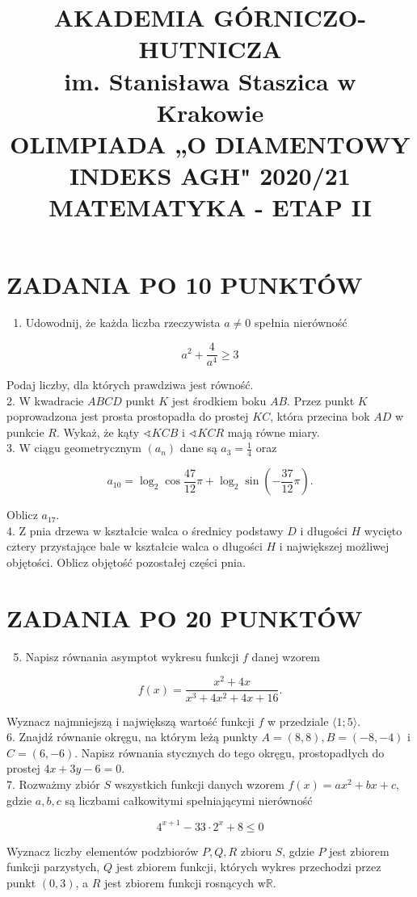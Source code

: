 \documentclass[10pt]{article}
\title{AKADEMIA GÓRNICZO-HUTNICZA \\
 im. Stanisława Staszica w Krakowie \\
 OLIMPIADA „O DIAMENTOWY INDEKS AGH" 2020/21 \\
 MATEMATYKA - ETAP II }
\author{}
\date{}
\newcommand\varangle{\mathop{\sphericalangle}}
\begin{document}
\maketitle
\section*{ZADANIA PO 10 PUNKTÓW}
\begin{enumerate}
  \item Udowodnij, że każda liczba rzeczywista $a \neq 0$ spełnia nierówność
\end{enumerate}

$$
a^{2}+\frac{4}{a^{4}} \geqslant 3
$$

Podaj liczby, dla których prawdziwa jest równość.\\
2. W kwadracie $A B C D$ punkt $K$ jest środkiem boku $A B$. Przez punkt $K$ poprowadzona jest prosta prostopadła do prostej $K C$, która przecina bok $A D$ w punkcie $R$. Wykaż, że kąty $\varangle K C B$ i $\varangle K C R$ mają równe miary.\\
3. W ciągu geometrycznym $\left(a_{n}\right)$ dane są $a_{3}=\frac{1}{4}$ oraz

$$
a_{10}=\log _{2} \cos \frac{47}{12} \pi+\log _{2} \sin \left(-\frac{37}{12} \pi\right) .
$$

Oblicz $a_{17}$.\\
4. Z pnia drzewa w kształcie walca o średnicy podstawy $D$ i długości $H$ wycięto cztery przystające bale w kształcie walca o długości $H$ i największej możliwej objętości. Oblicz objętość pozostałej części pnia.

\section*{ZADANIA PO 20 PUNKTÓW}
\begin{enumerate}
  \setcounter{enumi}{4}
  \item Napisz równania asymptot wykresu funkcji $f$ danej wzorem
\end{enumerate}

$$
f(x)=\frac{x^{2}+4 x}{x^{3}+4 x^{2}+4 x+16} .
$$

Wyznacz najmniejszą i największą wartość funkcji $f$ w przedziale $\langle 1 ; 5\rangle$.\\
6. Znajdź równanie okręgu, na którym leżą punkty $A=(8,8), B=(-8,-4)$ i $C=(6,-6)$. Napisz równania stycznych do tego okręgu, prostopadłych do prostej $4 x+3 y-6=0$.\\
7. Rozważmy zbiór $S$ wszystkich funkcji danych wzorem $f(x)=a x^{2}+b x+c$, gdzie $a, b, c$ są liczbami całkowitymi spełniającymi nierówność

$$
4^{x+1}-33 \cdot 2^{x}+8 \leqslant 0
$$

Wyznacz liczby elementów podzbiorów $P, Q, R$ zbioru $S$, gdzie $P$ jest zbiorem funkcji parzystych, $Q$ jest zbiorem funkcji, których wykres przechodzi przez punkt $(0,3)$, a $R$ jest zbiorem funkcji rosnących $\mathrm{w} \mathbb{R}$.
\end{document}
